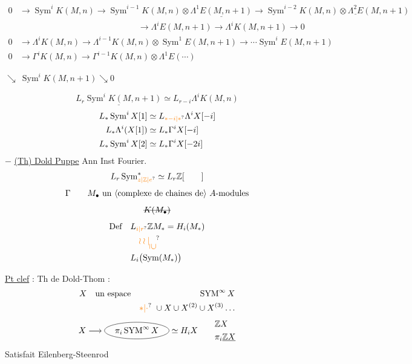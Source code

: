 {\scriptsize
\[
\begin{aligned}
0&\longrightarrow\operatorname{Sym}^{i}K(M,n)\longrightarrow
\operatorname{Sym}^{i-1}K(M,n)\otimes\underline{\Lambda^{1}E(M,n+1)}
\longrightarrow\operatorname{Sym}^{i-2}K(M,n)\otimes\underline{\Lambda^{2}E}(M,n+1)\\
&\hspace{14em}\longrightarrow\Lambda^{i}E(M,n+1)\longrightarrow\Lambda^{i}K(M,n+1)\longrightarrow0
\end{aligned}
\]
\[
\begin{aligned}
0&\longrightarrow\Lambda^{i}K(M,n)\longrightarrow\Lambda^{i-1}K(M,n)\otimes\operatorname{Sym}^{1}E(M,n+1)
\longrightarrow\cdots\operatorname{Sym}^{i}E(M,n+1)\\[-1pt]
0&\longrightarrow\Gamma^{i}K(M,n)\longrightarrow\Gamma^{i-1}K(M,n)\otimes\Lambda^{1}E(\cdots)
\end{aligned}
\]
}
\begin{flushright}
$\searrow\ \operatorname{Sym}^{i}K(M,n+1)\searrow 0$
\end{flushright}
\[
\boxed{\underline{L_r\operatorname{Sym}^{i}K(M,n+1)}\simeq L_{r-i}\Lambda^{i}K(M,n)}
\]
\[
\begin{aligned}
L_{*}\operatorname{Sym}^{i}X[1]&\simeq L_{\unsure{*-i|*}}\Lambda^{i}X[-i]\\
L_{*}\Lambda^{i}(X[1])&\simeq L_{*}\Gamma^{i}X[-i]\\
L_{*}\operatorname{Sym}^{i}X[2]&\simeq L_{*}\Gamma^{i}X[-2i]
\end{aligned}
\]
\noindent $-$
\uline{(Th) Dold Puppe} Ann Inst Fourier.
\[
L_r\operatorname{Sym}_{\unsure{z|\mathbb Z|e}}^{*}\simeq L_r\mathbb Z[\qquad]
\]
\[
\Gamma\qquad M_{\bullet}\ \text{un \inserted{complexe de chaines de} $A$-modules}
\]
\[
\deleted{K(M_{\bullet})}
\]
\[
\begin{aligned}
\text{Def}\quad & L_{\unsure{i|r}}\mathbb Z M_{*}=H_i(M_{*})\\
&\quad\unsure{\wr\wr|\rotatebox{-90}{$\supseteq$}}\\
& L_i\bigl(\operatorname{Sym}(M_{*})\bigr)
\end{aligned}
\]

\uline{Pt clef} : Th de Dold-Thom :
\[
\begin{aligned}
X\quad&\text{un espace} &\operatorname{SYM}^{\infty}X\\
&&\unsure{*|\cdot}\ \cup X\cup X^{(2)}\cup X^{(3)}\ldots
\end{aligned}
\]
\[
X\longrightarrow
\tikz[baseline=(a.base)]{\node[inner sep=1pt](a){$\pi_i\operatorname{SYM}^{\infty}X$};\draw (a.center) ellipse (1.35cm and .34cm);}
\simeq H_i X
\qquad
\begin{aligned}&\mathbb Z X\\&\pi_i\underline{\mathbb Z X}\end{aligned}
\]
Satisfait   Eilenberg-Steenrod


